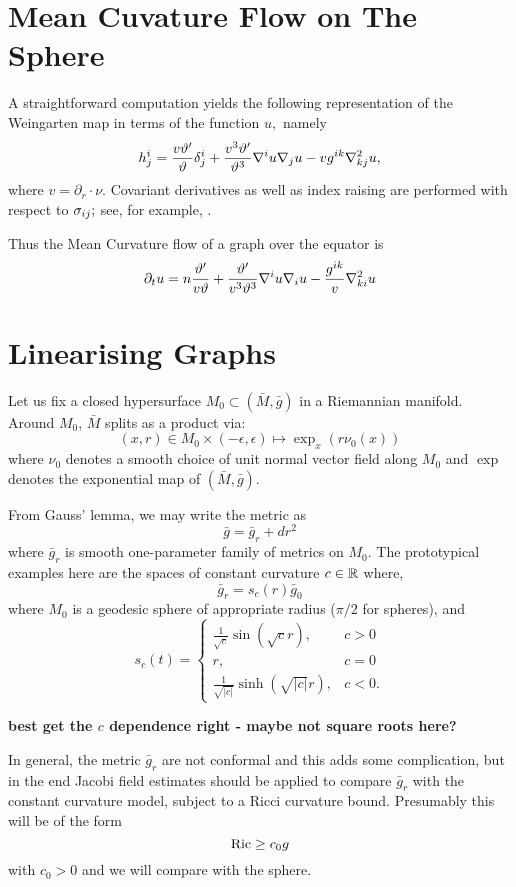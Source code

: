 \documentclass{amsart}
\begin{document}
\section{Mean Cuvature Flow on The Sphere}
\label{sec:mcf_sphere}

A straightforward computation yields the following representation of the Weingarten map in terms of the function $u,$ namely
\[
\label{graph h}h^i_j = \frac{v\vartheta'}{\vartheta} \delta^i_j + \frac{v^3\vartheta'}{\vartheta^3} \nabla^i u \nabla_j u - v g^{ik} \nabla^2_{kj}u,
\]
where $v = \partial_r \cdot \nu.$ Covariant derivatives as well as index raising are performed with respect to $\sigma_{ij};$ see, for example, \cite[(3.32)]{Scheuer:05/2015}.

Thus the Mean Curvature flow of a graph over the equator is
\[
\partial_t u = n \frac{\vartheta'}{v\vartheta}+ \frac{\vartheta'}{v^3\vartheta^3}\nabla^iu\nabla_iu - \frac{g^{ik}}{v}\nabla^2_{ki}u
\]

\section{Linearising Graphs}
\label{sec:linearising_graphs}

Let us fix a closed hypersurface \(M_0 \subset (\bar{M}, \bar{g})\) in a Riemannian manifold. Around \(M_0\), \(\bar{M}\) splits as a product via:
\[
(x, r) \in M_0 \times (-\epsilon, \epsilon) \mapsto \exp_x(r \nu_0(x))
\]
where \(\nu_0\) denotes a smooth choice of unit normal vector field along \(M_0\) and \(\exp\) denotes the exponential map of \((\bar{M}, \bar{g})\).

From Gauss' lemma, we may write the metric as
\[
\bar{g} = \bar{g}_r + dr^2
\]
where \(\bar{g}_r\) is smooth one-parameter family of metrics on \(M_0\). The prototypical examples here are the spaces of constant curvature \(c \in \mathbb{R}\) where,
\[
\bar{g}_r = s_c (r) \bar{g}_0
\]
where \(M_0\) is a geodesic sphere of appropriate radius (\(\pi/2\) for spheres), and
\[
s_c(t) = \begin{cases}
\frac{1}{\sqrt{c}} \sin(\sqrt{c} r), & c > 0 \\
r, & c = 0 \\
\frac{1}{\sqrt{|c|}} \sinh(\sqrt{|c|} r), & c < 0.
\end{cases}
\]

\textbf{best get the \(c\) dependence right - maybe not square roots here?}

In general, the metric \(\bar{g}_r\) are not conformal and this adds some complication, but in the end Jacobi field estimates should be applied to compare \(\bar{g}_r\) with the constant curvature model, subject to a Ricci curvature bound. Presumably this will be of the form
\[
\operatorname{Ric} \geq c_0 g
\]
with \(c_0 > 0\) and we will compare with the sphere.
\end{document}
